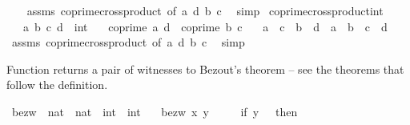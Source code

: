 \begin{isabellebody}
%
\isadelimproof
\ \ %
\endisadelimproof
%
\isatagproof
{}\isamarkupfalse%
\ assms\ coprime{\isacharunderscore}{\kern0pt}crossproduct\ {\isacharbrackleft}{\kern0pt}of\ a\ d\ b\ c{\isacharbrackright}{\kern0pt}\ \isamarkupfalse%
\ simp%
\endisatagproof
{\isafoldproof}%
%
\isadelimproof
\isanewline
%
\endisadelimproof
\isanewline
{}\isamarkupfalse%
\ coprime{\isacharunderscore}{\kern0pt}crossproduct{\isacharunderscore}{\kern0pt}int{\isacharcolon}{\kern0pt}\isanewline
\ \ \ a\ b\ c\ d\ {\isacharcolon}{\kern0pt}{\isacharcolon}{\kern0pt}\ int\isanewline
\ \ \ {\isachardoublequoteopen}coprime\ a\ d{\isachardoublequoteclose}\ \ {\isachardoublequoteopen}coprime\ b\ c{\isachardoublequoteclose}\isanewline
\ \ \ {\isachardoublequoteopen}{\isasymbar}a{\isasymbar}\ {\isacharasterisk}{\kern0pt}\ {\isasymbar}c{\isasymbar}\ {\isacharequal}{\kern0pt}\ {\isasymbar}b{\isasymbar}\ {\isacharasterisk}{\kern0pt}\ {\isasymbar}d{\isasymbar}\ {\isasymlongleftrightarrow}\ {\isasymbar}a{\isasymbar}\ {\isacharequal}{\kern0pt}\ {\isasymbar}b{\isasymbar}\ {\isasymand}\ {\isasymbar}c{\isasymbar}\ {\isacharequal}{\kern0pt}\ {\isasymbar}d{\isasymbar}{\isachardoublequoteclose}\isanewline
%
\isadelimproof
\ \ %
\endisadelimproof
%
\isatagproof
{}\isamarkupfalse%
\ assms\ coprime{\isacharunderscore}{\kern0pt}crossproduct\ {\isacharbrackleft}{\kern0pt}of\ a\ d\ b\ c{\isacharbrackright}{\kern0pt}\ \isamarkupfalse%
\ simp%
\endisatagproof
{\isafoldproof}%
%
\isadelimproof
%
\endisadelimproof
%
\isadelimdocument
%
\endisadelimdocument
%
\isatagdocument
%
\isamarkuptrue%
%
\endisatagdocument
{\isafolddocument}%
%
\isadelimdocument
%
\endisadelimdocument
%
\begin{isamarkuptext}%
Function  returns a pair of witnesses to Bezout's theorem --
  see the theorems that follow the definition.%
\end{isamarkuptext}\isamarkuptrue%
\isamarkupfalse%
\ bezw\ {\isacharcolon}{\kern0pt}{\isacharcolon}{\kern0pt}\ {\isachardoublequoteopen}nat\ {\isasymRightarrow}\ nat\ {\isasymRightarrow}\ int\ {\isacharasterisk}{\kern0pt}\ int{\isachardoublequoteclose}\isanewline
\ \ \ {\isachardoublequoteopen}bezw\ x\ y\ {\isacharequal}{\kern0pt}\isanewline
\ \ \ \ {\isacharparenleft}{\kern0pt}if\ y\ {\isacharequal}{\kern0pt}\ {}\ then\ {\isacharparenleft}{\kern0pt}{}{\isacharcomma}{\kern0pt}\ {}{\isacharparenright}{\kern0pt}\isanewline

\end{isabellebody}
